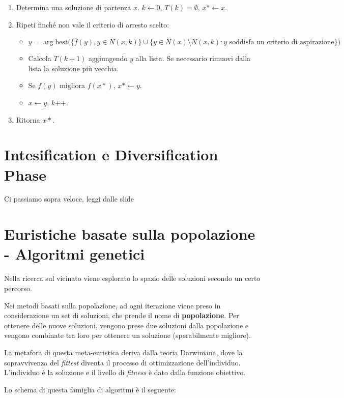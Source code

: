 \begin{enumerate}
	\item Determina una soluzione di partenza $x$. $k \leftarrow 0$, $T(k) = \emptyset$, $x* \leftarrow x$.
	\item Ripeti finché non vale il criterio di arresto scelto:
	\begin{itemize}
		\item $$
		y = \arg \text{best} \bigg( \Big\{ \overline{f}(y), y \in N(x,k) \Big\} \cup \Big\{ y \in N(x) \setminus N(x,k) : y \text{ soddisfa un criterio di aspirazione}\Big\} \bigg)
		$$
		\item Calcola $T(k+1)$ aggiungendo $y$ alla lista. Se necessario rimuovi dalla lista la soluzione più vecchia.
		\item Se $f(y)$ migliora $f(x*)$, $x* \leftarrow y$.
		\item $x \leftarrow y$, $k\text{++}$.
	\end{itemize}
	\item Ritorna $x*$.
\end{enumerate}

\section{Intesification e Diversification Phase}

Ci passiamo sopra veloce, leggi dalle slide

\section{Euristiche basate sulla popolazione - Algoritmi genetici}

Nella ricerca sul vicinato viene esplorato lo spazio delle soluzioni secondo un certo percorso.

Nei metodi basati sulla popolazione, ad ogni iterazione viene preso in considerazione un set di soluzioni, che prende il nome di \textbf{popolazione}. Per ottenere delle nuove soluzioni, vengono prese due soluzioni dalla popolazione e vengono combinate tra loro per ottenere un soluzione (sperabilmente migliore).

La metafora di questa meta-euristica deriva dalla teoria Darwiniana, dove la sopravvivenza del \textit{fittest} diventa il processo di ottimizzazione dell'individuo. L'individuo è la soluzione e il livello di \textit{fitness} è dato dalla funzione obiettivo.

Lo schema di questa famiglia di algoritmi è il seguente:

